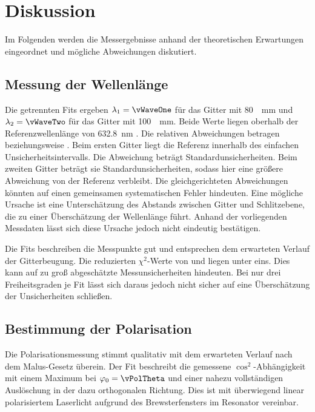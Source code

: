 \newpage
\section{Diskussion}
\label{sec:Diskussion}

Im Folgenden werden die Messergebnisse anhand der theoretischen Erwartungen
eingeordnet und mögliche Abweichungen diskutiert.

\subsection{Messung der Wellenlänge}

Die getrennten Fits ergeben $\lambda_1=\vWaveOne$ für das Gitter mit
\qty[per-mode=reciprocal]{80}{\per\milli\meter} und $\lambda_2=\vWaveTwo$
für das Gitter mit \qty[per-mode=reciprocal]{100}{\per\milli\meter}.
Beide Werte liegen oberhalb der Referenzwellenlänge von
\qty{632.8}{\nano\meter} \cite[2]{eLas_HeNe}. Die relativen Abweichungen
betragen \vWaveOneDeviation{} beziehungsweise \vWaveTwoDeviation{}.
Beim ersten Gitter liegt die Referenz innerhalb des einfachen
Unsicherheitsintervalls. Die Abweichung beträgt
\vWaveOneReferenceSigma{} Standardunsicherheiten. Beim zweiten Gitter
beträgt sie \vWaveTwoReferenceSigma{} Standardunsicherheiten, sodass
hier eine größere Abweichung von der Referenz verbleibt. Die gleichgerichteten
Abweichungen könnten auf einen gemeinsamen systematischen Fehler hindeuten. 
Eine mögliche Ursache ist eine Unterschätzung des Abstands zwischen Gitter
und Schlitzebene, die zu einer Überschätzung der Wellenlänge führt. Anhand
der vorliegenden Messdaten lässt sich diese Ursache jedoch nicht eindeutig bestätigen.

Die Fits beschreiben die Messpunkte gut und entsprechen dem erwarteten
Verlauf der Gitterbeugung. Die reduzierten $\chi^2$-Werte von
\vWaveOneChi{} und \vWaveTwoChi{} liegen unter eins. Dies kann auf zu groß
abgeschätzte Messunsicherheiten hindeuten. Bei nur drei Freiheitsgraden je
Fit lässt sich daraus jedoch nicht sicher auf eine Überschätzung der
Unsicherheiten schließen.

\subsection{Bestimmung der Polarisation}

Die Polarisationsmessung stimmt qualitativ mit dem erwarteten Verlauf nach
dem Malus-Gesetz überein. Der Fit beschreibt die gemessene
$\cos^2$-Abhängigkeit mit einem Maximum bei $\varphi_0=\vPolTheta$ und
einer nahezu vollständigen Auslöschung in der dazu orthogonalen Richtung.
Dies ist mit überwiegend linear polarisiertem Laserlicht aufgrund des Brewsterfensters
im Resonator vereinbar.

